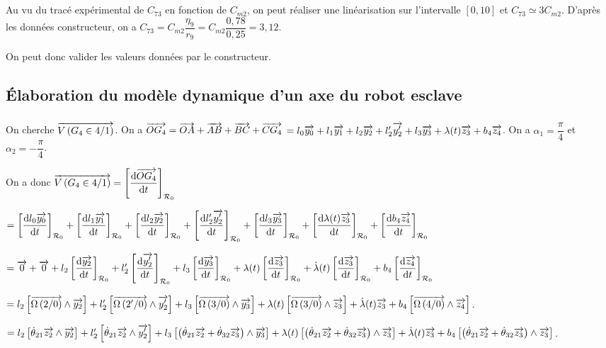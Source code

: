 \documentclass[10pt,fleqn]{article} %
\begin{document}
\subparagraph{}%
Au vu du tracé expérimental de $C_{73}$ en fonction de $C_{m2}$, on peut réaliser une linéarisation sur l'intervalle $[0,10]$ et $C_{73}\simeq 3 C_{m2}$. 
D'après les données constructeur, on a $C_{73}=C_{m2}\dfrac{\eta_9}{r_9}=C_{m2}\dfrac{0,78}{0,25}=3,12$.

On peut donc valider les valeurs données par le constructeur.
\subsection{Élaboration du modèle dynamique d’un axe du robot esclave}


\subparagraph{}%
\subparagraph{}%
\subparagraph{}%
On cherche $\overrightarrow{V\left( {G_4} \in {4}/{1}\right)}$. On a $\overrightarrow{OG_4}=\overrightarrow{OA}+\overrightarrow{AB}+\overrightarrow{BC}+\overrightarrow{CG_4}$ $=l_0\overrightarrow{y_0}+l_1\overrightarrow{y_1}+l_2\overrightarrow{y_2}+l_2'\overrightarrow{y_2'}+l_3\overrightarrow{y_3}+\lambda(t)\overrightarrow{z_3}+b_4\overrightarrow{z_4}$.
On a $\alpha_1=\dfrac{\pi}{4}$ et $\alpha_2=-\dfrac{\pi}{4}$.

On a donc $\overrightarrow{V\left( {G_4} \in {4}/{1}\right)}= \left[\dfrac{\text{d} \overrightarrow{OG_4}}{\text{d} t}\right]_{\mathcal{R}_{0}} $ 

$= 
\left[\dfrac{\text{d} l_0\overrightarrow{y_0}}{\text{d} t}\right]_{\mathcal{R}_{0}}+
\left[\dfrac{\text{d} l_1\overrightarrow{y_1}}{\text{d} t}\right]_{\mathcal{R}_{0}}+
\left[\dfrac{\text{d} l_2\overrightarrow{y_2}}{\text{d} t}\right]_{\mathcal{R}_{0}}+
\left[\dfrac{\text{d} l_2'\overrightarrow{y_2'}}{\text{d} t}\right]_{\mathcal{R}_{0}}+
\left[\dfrac{\text{d} l_3\overrightarrow{y_3}}{\text{d} t}\right]_{\mathcal{R}_{0}}+
\left[\dfrac{\text{d} \lambda(t)\overrightarrow{z_3}}{\text{d} t}\right]_{\mathcal{R}_{0}}+
\left[\dfrac{\text{d} b_4\overrightarrow{z_4}}{\text{d} t}\right]_{\mathcal{R}_{0}}$

$= 
\overrightarrow{0}+
\overrightarrow{0}+
l_2\left[\dfrac{\text{d} \overrightarrow{y_2}}{\text{d} t}\right]_{\mathcal{R}_{0}}+
l_2'\left[\dfrac{\text{d} \overrightarrow{y_2'}}{\text{d} t}\right]_{\mathcal{R}_{0}}+
l_3\left[\dfrac{\text{d} \overrightarrow{y_3}}{\text{d} t}\right]_{\mathcal{R}_{0}}+
\lambda(t)\left[\dfrac{\text{d} \overrightarrow{z_3}}{\text{d} t}\right]_{\mathcal{R}_{0}}+
\dot{\lambda}(t)\left[\dfrac{\text{d} \overrightarrow{z_3}}{\text{d} t}\right]_{\mathcal{R}_{0}}+
b_4\left[\dfrac{\text{d} \overrightarrow{z_4}}{\text{d} t}\right]_{\mathcal{R}_{0}}$

$= 
l_2\left[ \overrightarrow{\Omega\left( {2}/{0}\right)} \wedge \overrightarrow{y_2} \right]+
l_2'\left[ \overrightarrow{\Omega\left( {2'}/{0}\right)} \wedge \overrightarrow{y_2'} \right]+
l_3\left[ \overrightarrow{\Omega\left( {3}/{0}\right)} \wedge \overrightarrow{y_3} \right]+
\lambda(t)\left[ \overrightarrow{\Omega\left( {3}/{0}\right)} \wedge \overrightarrow{z_3} \right]+
\dot{\lambda}(t)\overrightarrow{z_3}+
b_4\left[ \overrightarrow{\Omega\left( {4}/{0}\right)} \wedge \overrightarrow{z_4} \right]$. 

$= 
l_2\left[ \dot{\theta}_{21}\overrightarrow{z_2} \wedge \overrightarrow{y_2} \right]+
l_2'\left[ \dot{\theta}_{21}\overrightarrow{z_2} \wedge \overrightarrow{y_2'} \right]+
l_3\left[ \left(\dot{\theta}_{21}\overrightarrow{z_2}+\dot{\theta}_{32}\overrightarrow{z_3} \right) \wedge \overrightarrow{y_3} \right]+
\lambda(t)\left[ \left(\dot{\theta}_{21}\overrightarrow{z_2}+\dot{\theta}_{32}\overrightarrow{z_3} \right) \wedge \overrightarrow{z_3} \right]+
\dot{\lambda}(t)\overrightarrow{z_3}+
b_4\left[ \left(\dot{\theta}_{21}\overrightarrow{z_2}+\dot{\theta}_{32}\overrightarrow{z_3} \right) \wedge \overrightarrow{z_3} \right]$. 
\end{document}
